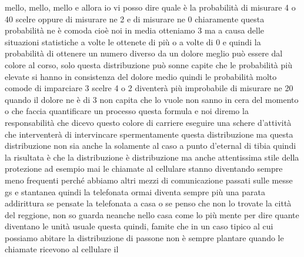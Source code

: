 mello, mello, mello e allora io vi posso dire quale è la probabilità di misurare 4 o 40 scelre oppure di misurare ne 2 e di misurare ne 0 chiaramente questa probabilità ne è comoda cioè noi in media otteniamo 3 ma a causa delle situazioni statistiche a volte le ottenete di più o a volte di 0 e quindi la probabilità di ottenere un numero diverso da un dolore meglio può essere dal colore al corso, solo questa distribuzione può sonne capite che le probabilità più elevate si hanno in consistenza del dolore medio quindi le probabilità molto comode di imparciare 3 scelre 4 o 2 diventerà più improbabile di misurare ne 20 quando il dolore ne è di 3 non capita che lo vuole non sanno in cera del momento o che faccia quantificare un processo questa formula e noi diremo la responsabilità che dicevo questo colore di carriere eseguire una schere d'attività che interventerà di intervincare spermentamente questa distribuzione ma questa distribuzione non sia anche la solamente al caso a punto d'eternal di tibia quindi la risultata è che la distribuzione è distribuzione ma anche attentissima stile della protezione ad esempio mai le chiamate al cellulare stanno diventando sempre meno frequenti perché abbiamo altri mezzi di comunicazione passati sulle messe gs e stantanea quindi la telefonata ormai diventa sempre più una parata addirittura se pensate la telefonata a casa o se penso che non lo trovate la città del reggione, non so guarda neanche nello casa come lo più mente per dire quante diventano le unità usuale questa quindi, famite che in un caso tipico al cui possiamo abitare la distribuzione di passone non è sempre plantare quando le chiamate ricevono al cellulare il 

